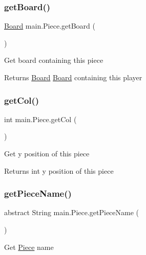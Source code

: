 \subsubsection{\texorpdfstring{getBoard()}{getBoard()}}
{\footnotesize\ttfamily \mbox{\hyperlink{classmain_1_1_board}{Board}} main.\+Piece.\+get\+Board (\begin{DoxyParamCaption}{ }\end{DoxyParamCaption})\hspace{0.3cm}{\ttfamily [inline]}}

Get board containing this piece \begin{DoxyReturn}{Returns}
\mbox{\hyperlink{classmain_1_1_board}{Board}} \mbox{\hyperlink{classmain_1_1_board}{Board}} containing this player 
\end{DoxyReturn}
\mbox{\label{classmain_1_1_piece_a8bd82e7f1f966d64d6ae71ea6a1b2866}} 
\subsubsection{\texorpdfstring{getCol()}{getCol()}}
{\footnotesize\ttfamily int main.\+Piece.\+get\+Col (\begin{DoxyParamCaption}{ }\end{DoxyParamCaption})\hspace{0.3cm}{\ttfamily [inline]}}

Get y position of this piece \begin{DoxyReturn}{Returns}
int y position of this piece 
\end{DoxyReturn}
\mbox{\label{classmain_1_1_piece_a7bfe35e868d389f1e0bba2c5499fe6b0}} 
\subsubsection{\texorpdfstring{getPieceName()}{getPieceName()}}
{\footnotesize\ttfamily abstract String main.\+Piece.\+get\+Piece\+Name (\begin{DoxyParamCaption}{ }\end{DoxyParamCaption})\hspace{0.3cm}{\ttfamily [abstract]}}

Get \mbox{\hyperlink{classmain_1_1_piece}{Piece}} name 

